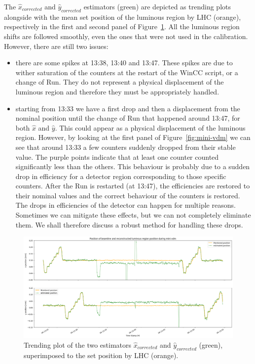 The $\hat{x}_{corrected}$ and $\hat{y}_{corrected}$ estimators (green) are depicted as trending plots alongside with the mean set position of the luminous region by LHC (orange), respectively in the first and second panel of Figure~\ref{fig:traceplot_outliers}. All the luminous region shifts are followed smoothly, even the ones that were not used in the calibration. However, there are still two issues:
\begin{itemize}
    \item there are some spikes at 13:38, 13:40 and 13:47. These spikes are due to wither saturation of the counters at the restart of the WinCC script, or a change of Run. They do not represent a physical displacement of the luminous region and therefore they must be appropriately handled.
    \item starting from 13:33 we have a first drop and then a displacement from the nominal position until the change of Run that happened around 13:47, for both $\hat{x}$ and $\hat{y}$. This could appear as a physical displacement of the luminous region. However, by looking at the first panel of Figure~\ref{fig:mini-vdm} we can see that around 13:33 a few counters suddenly dropped from their stable value. The purple points indicate that at least one counter counted significantly less than the others. This behaviour is probably due to a sudden drop in efficiency for a detector region corresponding to those specific counters. After the Run is restarted (at 13:47), the efficiencies are restored to their nominal values and the correct behaviour of the counters is restored. The drops in efficiencies of the detector can happen for multiple reasons. Sometimes we can mitigate these effects, but we can not completely eliminate them. We shall therefore discuss a robust method for handling these drops.
\end{itemize}

\begin{figure}
    \centering
    \includegraphics[width=\textwidth]{figures/traceplot_wo_median.png}
    \caption{Trending plot of the two estimators $\hat{x}_{corrected}$ and $\hat{y}_{corrected}$ (green), superimposed to the set position by LHC (orange).  }
    \label{fig:traceplot_outliers}
\end{figure}

